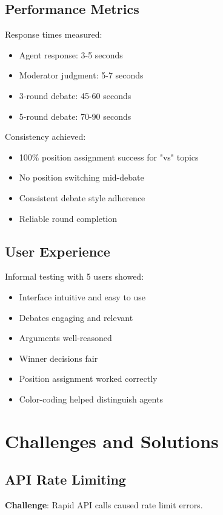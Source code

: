 \documentclass[conference]{IEEEtran}
\begin{document}
\subsection{Performance Metrics}

Response times measured:
\begin{itemize}
\item Agent response: 3-5 seconds
\item Moderator judgment: 5-7 seconds
\item 3-round debate: 45-60 seconds
\item 5-round debate: 70-90 seconds
\end{itemize}

Consistency achieved:
\begin{itemize}
\item 100\% position assignment success for "vs" topics
\item No position switching mid-debate
\item Consistent debate style adherence
\item Reliable round completion
\end{itemize}

\subsection{User Experience}

Informal testing with 5 users showed:
\begin{itemize}
\item Interface intuitive and easy to use
\item Debates engaging and relevant
\item Arguments well-reasoned
\item Winner decisions fair
\item Position assignment worked correctly
\item Color-coding helped distinguish agents
\end{itemize}

\section{Challenges and Solutions}

\subsection{API Rate Limiting}

\textbf{Challenge}: Rapid API calls caused rate limit errors.
\end{document}
